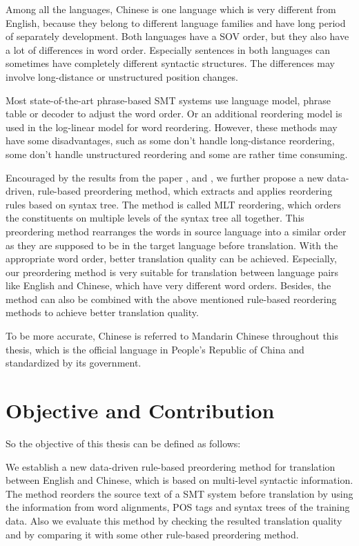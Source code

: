 Among all the languages, Chinese is one language which is very different from English, because they belong to different language families and have long period of separately development. Both languages have a \ac{SOV} order, but they also have a lot of differences in word order. Especially sentences in both languages can sometimes have completely different syntactic structures. The differences may involve long-distance or unstructured position changes.

Most state-of-the-art phrase-based \ac{SMT} systems use language model, phrase table or decoder to adjust the word order. Or an additional reordering model is used in the log-linear model for word reordering. However, these methods may have some disadvantages, such as some don't handle long-distance reordering, some don't handle unstructured reordering and some are rather time consuming.

Encouraged by the results from the paper \cite{short}, \cite{long} and \cite{tree}, we further propose a new data-driven, rule-based preordering method, which extracts and applies reordering rules based on syntax tree. The method is called \ac{MLT} reordering, which orders the constituents on multiple levels of the syntax tree all together. This preordering method rearranges the words in source language into a similar order as they are supposed to be in the target language before translation. With the appropriate word order, better translation quality can be achieved. Especially, our preordering method is very suitable for translation between language pairs like English and Chinese, which have very different word orders. Besides, the method can also be combined with the above mentioned rule-based reordering methods to achieve better translation quality. 

To be more accurate, Chinese is referred to Mandarin Chinese throughout this thesis, which is the official language in People's Republic of China and standardized by its government.

\section{Objective and Contribution}
\label{ch:Introduction:sec:ObjectiveAndContribution}

So the objective of this thesis can be defined as follows:

\begin{center}
\parbox[c]{0.8\textwidth}{
We establish a new data-driven rule-based preordering method for translation between English and Chinese, which is based on multi-level syntactic information. The method reorders the source text of a \ac{SMT} system before translation by using the information from word alignments, \ac{POS} tags and syntax trees of the training data. Also we evaluate this method by checking the resulted translation quality and by comparing it with some other rule-based preordering method.
}
\end{center}

